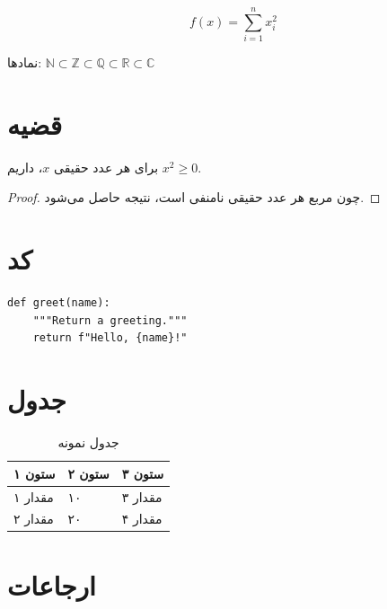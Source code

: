 \documentclass{matinbook}
\begin{document}
\begin{equation}
    \label{eq:rtl-test}
    f(x) = \sum_{i=1}^{n} x_i^2
\end{equation}

نمادها: $\mathbb{N} \subset \mathbb{Z} \subset \mathbb{Q} \subset \mathbb{R} \subset \mathbb{C}$

\section{قضیه}
\label{sec:theorem}

\begin{theorem}
    برای هر عدد حقیقی $x$، داریم $x^2 \geq 0$.
\end{theorem}

\begin{proof}
    چون مربع هر عدد حقیقی نامنفی است، نتیجه حاصل می‌شود.
\end{proof}

\section{کد}
\label{sec:code}

\begin{latin}
\begin{verbatim}
def greet(name):
    """Return a greeting."""
    return f"Hello, {name}!"
\end{verbatim}
\end{latin}

\section{جدول}
\label{sec:table}

\begin{table}[h]
\centering
\caption{جدول نمونه}
\label{tab:rtl-test}
\begin{tabular}{L{3cm} C{2cm} R{3cm}}
\toprule
\textbf{ستون ۱} & \textbf{ستون ۲} & \textbf{ستون ۳} \\
\midrule
مقدار ۱ & ۱۰ & مقدار ۳ \\
مقدار ۲ & ۲۰ & مقدار ۴ \\
\bottomrule
\end{tabular}
\end{table}

\section{ارجاعات}
\label{sec:references}
\end{document}
